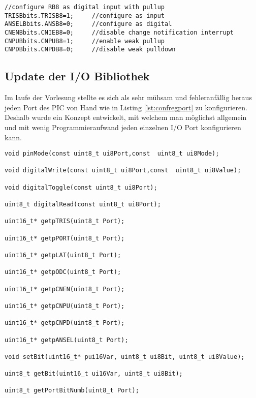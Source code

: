 \begin{lstlisting}[frame=htrbl, caption={Konfigurieren des Ports RB8 als Digitaler Input mit Pullup Widerstand}, label={lst:confregport}]
//configure RB8 as digital input with pullup
TRISBbits.TRISB8=1;     //configure as input
ANSELBbits.ANSB8=0;     //configure as digital
CNENBbits.CNIEB8=0;     //disable change notification interrupt
CNPUBbits.CNPUB8=1;     //enable weak pullup
CNPDBbits.CNPDB8=0;     //disable weak pulldown
\end{lstlisting}
\newpage
\subsection{Update der I/O Bibliothek}
Im laufe der Vorlesung stellte es sich als sehr mühsam und fehleranfällig heraus jeden Port des PIC von Hand wie in Listing \ref{lst:confregport} zu konfigurieren.\newline
Deshalb wurde ein Konzept entwickelt, mit welchem man möglichst allgemein und mit wenig Programmieraufwand jeden einzelnen I/O Port konfigurieren kann. \newline

\begin{lstlisting}[frame=htrbl, caption={Funktionsprototypen edaPIC33Hardware-Library}, label={lst:edaPIC33Hardware}]
void pinMode(const uint8_t ui8Port,const  uint8_t ui8Mode);

void digitalWrite(const uint8_t ui8Port,const  uint8_t ui8Value);

void digitalToggle(const uint8_t ui8Port);

uint8_t digitalRead(const uint8_t ui8Port);

uint16_t* getpTRIS(uint8_t Port);

uint16_t* getpPORT(uint8_t Port);

uint16_t* getpLAT(uint8_t Port);

uint16_t* getpODC(uint8_t Port);

uint16_t* getpCNEN(uint8_t Port);

uint16_t* getpCNPU(uint8_t Port);

uint16_t* getpCNPD(uint8_t Port);

uint16_t* getpANSEL(uint8_t Port);

void setBit(uint16_t* pui16Var, uint8_t ui8Bit, uint8_t ui8Value);

uint8_t getBit(uint16_t ui16Var, uint8_t ui8Bit);

uint8_t getPortBitNumb(uint8_t Port);

\end{lstlisting} 

